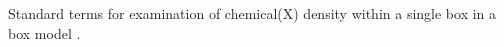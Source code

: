 \label{fig:boxModel}
Standard terms for examination of chemical(X) density within a single box in a box model \cite{Jacob_1999_book}.